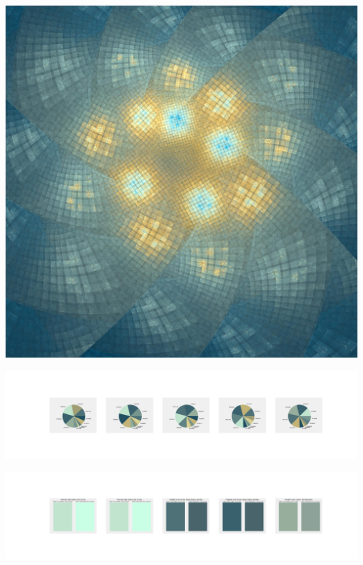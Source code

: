 \documentclass[11pt]{article}
\begin{document}
\begin{landscape}
    \begin{center}
    \includegraphics[width=\textwidth]{./nbimg/file (232).jpg}
    \end{center}

    \begin{center}
    \includegraphics[width=250mm]{./nbimg/pie-148.jpg}
    \end{center}

    \begin{center}
    \includegraphics[width=250mm]{./nbimg/peak-148.jpg}
    \end{center}
    


\end{landscape}
\end{document}

